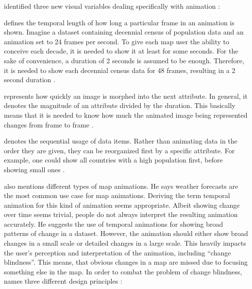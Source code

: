 \citeauthor{DiBiase1992} identified three new visual variables dealing specifically with animation :

\begin{enumerate}

 defines the temporal length of how long a particular frame in an animation is shown. Imagine a dataset containing decennial census of population data and an animation set to 24 frames per second. To give each map user the ability to conceive each decade, it is needed to show it at least for some seconds. For the sake of convenience, a duration of 2 seconds is assumed to be enough. Therefore, it is needed to show each decennial census data for 48 frames, resulting in a 2 second duration .

 represents how quickly an image is morphed into the next attribute. In general, it denotes the magnitude of an attribute divided by the duration. This basically means that it is needed to know how much the animated image being represented changes from frame to frame .

 denotes the sequential usage of data items. Rather than animating data in the order they are given, they can be reorganized first by a specific attribute. For example, one could show all countries with a high population first, before showing small ones .

\end{enumerate}

\citeauthor{Muehlenhaus2014} also mentions different types of map animations. He says weather forecasts are the most common use case for map animations. Deriving the term temporal animation for this kind of animation seems appropriate. Albeit showing change over time seems trivial, people do not always interpret the resulting animation accurately. He suggests the use of temporal animations for showing broad patterns of change in a dataset. However, the animation should either show broad changes in a small scale or detailed changes in a large scale. This heavily impacts the user's perception and interpretation of the animation, including ``change blindness''. This means, that obvious changes in a map are missed due to focusing something else in the map. In order to combat the problem of change blindness, \citeauthor{Muehlenhaus2014} names three different design principles :


